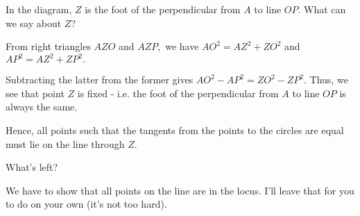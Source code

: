In the diagram, $Z$ is the foot of the perpendicular from $A$ to line $OP$. What can we say about $Z$?


From right triangles $AZO$ and $AZP,$ we have $AO^2 = AZ^2 + ZO^2$ and $AP^2 = AZ^2 + ZP^2.$


Subtracting the latter from the former gives $AO^2 - AP^2 = ZO^2 - ZP^2.$  Thus, we see that point $Z$ is fixed - i.e. the foot of the perpendicular from $A$ to line $OP$ is always the same.

Hence, all points such that the tangents from the points to the circles are equal must lie on the line through $Z.$

What's left?


We have to show that all points on the line are in the locus. I'll leave that for you to do on your own (it's not too hard).










